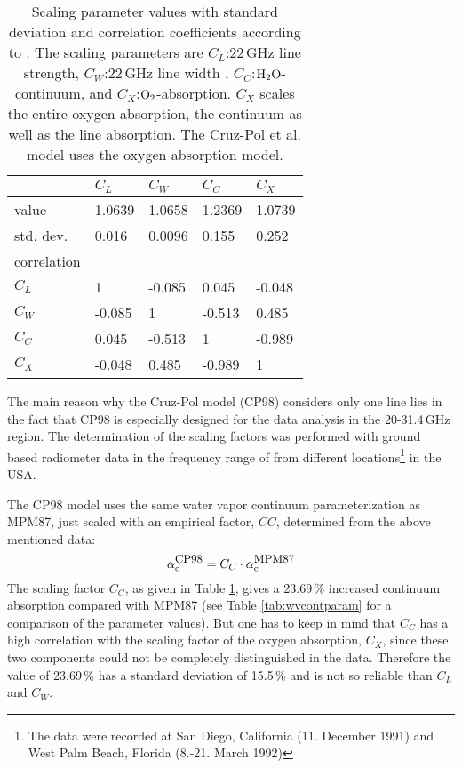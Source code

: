 {\begin{table}[!htb]
\begin{center}
\begin{tabular}{lllll}
\hline
            & $C_L$ & $C_W$ & $C_C$ & $C_X$ \\
\hline
value       & 1.0639 & 1.0658 & 1.2369 & 1.0739\\
std. dev.   & 0.016  & 0.0096 & 0.155  & 0.252\\
\hline
correlation & &&&\\
$C_L$       & 1      & -0.085 & 0.045  & -0.048\\
$C_W$       & -0.085 & 1      & -0.513 &  0.485\\
$C_C$       & 0.045  & -0.513 & 1      & -0.989\\
$C_X$       & -0.048 & 0.485  & -0.989 & 1\\
\hline
\end{tabular}
\end{center}
\caption{Scaling parameter values with standard deviation and 
  correlation coefficients according to \citep{cruzpol:98}.
  The scaling parameters are $C_L$:22\,GHz line strength, 
  $C_W$:22\,GHz line width , $C_C$:$\mbox{H}_2\mbox{O}$-continuum, and 
  $C_X$:$\mbox{O}_2$-absorption. $C_X$ scales the entire oxygen absorption, 
  the continuum as well as the line absorption. The Cruz-Pol et al.
  model uses the \cite{pwr:93} oxygen absorption model.}
\label{tab:cp_orr}
\end{table}

The main reason why the Cruz-Pol model (CP98) considers only one line
lies in the fact that CP98 is especially designed for the data analysis
in the 20-31.4\,GHz region. The determination of the scaling factors was 
performed with ground based radiometer data in the frequency range of
from different locations\footnote{The data were recorded at San Diego, 
California (11. December 1991) and West Palm Beach, Florida 
(8.-21. March 1992)} in the USA.


\label{levele:cp98_h2ocont}
The CP98 model uses the same water vapor continuum 
parameterization as MPM87, just scaled with an empirical 
factor, $CC$, determined from the above mentioned data:
\begin{equation}
 \label{eq:cp98_cont_scaling}
 \alpha^{\mbox{\rm \small CP98}}_{\rm c} = C_C \cdot \alpha^{\mbox{\rm \small MPM87}}_{\rm c} 
\end{equation}
The scaling factor $C_C$, as given in Table \ref{tab:cp_orr}, 
gives a 23.69\,\% increased continuum absorption compared 
with MPM87 (see Table \ref{tab:wvcontparam} for a comparison of the 
parameter values). But one has to keep in mind that $C_C$ has a 
high correlation with the scaling factor of the oxygen 
absorption, $C_X$, since these two components could not 
be completely distinguished in the data. Therefore the 
value of 23.69\,\% has a standard deviation of 15.5\,\% 
and is not so reliable than $C_L$ and $C_W$.





}

